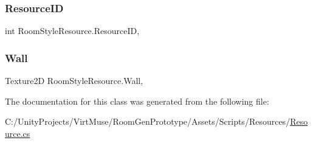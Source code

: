 \mbox{\label{class_room_style_resource_a113194d661027fdac0a956cdf19dc166}} 
\subsubsection{\texorpdfstring{Resource\+ID}{ResourceID}}
{\footnotesize\ttfamily int Room\+Style\+Resource.\+Resource\+ID\hspace{0.3cm}{\ttfamily [get]}, {\ttfamily [set]}}

\mbox{\label{class_room_style_resource_a7e7f15cc941b23c889b3ff8f1b05e732}} 
\subsubsection{\texorpdfstring{Wall}{Wall}}
{\footnotesize\ttfamily Texture2D Room\+Style\+Resource.\+Wall\hspace{0.3cm}{\ttfamily [get]}, {\ttfamily [set]}}



The documentation for this class was generated from the following file\+:\begin{DoxyCompactItemize}
\item 
C\+:/\+Unity\+Projects/\+Virt\+Muse/\+Room\+Gen\+Prototype/\+Assets/\+Scripts/\+Resources/\mbox{\hyperlink{_resource_8cs}{Resource.\+cs}}\end{DoxyCompactItemize}
